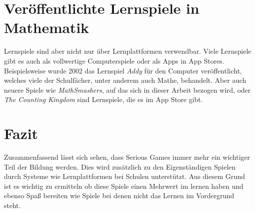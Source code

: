 \section{Veröffentlichte Lernspiele in Mathematik}
Lernspiele sind aber nicht nur über Lernplattformen verwendbar. Viele Lernspiele gibt es auch als vollwertige Computerspiele oder als Apps in App Stores. Beispielsweise wurde 2002 das Lernspiel \textit{Addy} für den Computer veröffentlicht, welches viele der Schulfächer, unter anderem auch Mathe, behandelt. Aber auch neuere Spiele wie \textit{MathSmashers}, auf das sich in dieser Arbeit bezogen wird, oder \textit{The Counting Kingdom} sind Lernspiele, die es im App Store gibt.
\section{Fazit}
Zusammenfassend lässt sich sehen, dass Serious Games immer mehr ein wichtiger Teil der Bildung werden. Dies wird zusätzlich zu den Eigenständigen Spielen durch Systeme wie Lernplattformen bei Schulen unterstützt. Aus diesem Grund ist es wichtig zu ermitteln ob diese Spiele einen Mehrwert im lernen haben und ebenso Spaß bereiten wie Spiele bei denen nicht das Lernen im Vordergrund steht.
